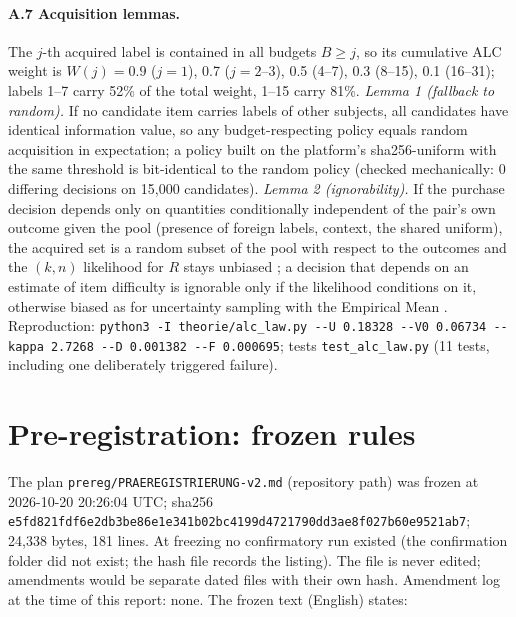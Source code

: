 \documentclass{article}
\newcommand{\dd}{-{}-}%
\newcommand{\prereghashtex}{e5fd821fdf6e2db3be86e1e341b02bc4\allowbreak 199d4721790dd3ae8f027b60e9521ab7}
\newcommand{\preregtime}{2026-10-20 20:26:04 UTC}
\begin{document}
\paragraph{A.7 Acquisition lemmas.} The $j$-th acquired label is contained in all budgets $B \ge j$, so its cumulative
ALC weight is $W(j) = 0.9$ ($j = 1$), 0.7 ($j = 2$--3), 0.5 (4--7), 0.3 (8--15), 0.1 (16--31); labels 1--7 carry 52\% of
the total weight, 1--15 carry 81\%. \emph{Lemma 1 (fallback to random).} If no candidate item carries labels of other
subjects, all candidates have identical information value, so any budget-respecting policy equals random acquisition
in expectation; a policy built on the platform's sha256-uniform with the same threshold is bit-identical to the random
policy (checked mechanically: 0 differing decisions on 15,000 candidates). \emph{Lemma 2 (ignorability).} If the purchase
decision depends only on quantities conditionally independent of the pair's own outcome given the pool (presence of
foreign labels, context, the shared uniform), the acquired set is a random subset of the pool with respect to the
outcomes and the $(k, n)$ likelihood for $R$ stays unbiased \citep{rubin1976}; a decision that depends on an estimate of
item difficulty is ignorable only if the likelihood conditions on it, otherwise biased as for uncertainty sampling with
the Empirical Mean \citep{kossen2021activetesting, sawade2010activerisk}. Reproduction:
\texttt{python3 -I theorie/alc\_law.py \dd U 0.18328 \dd V0 0.06734 \dd kappa 2.7268 \dd D 0.001382 \dd F 0.000695};
tests \texttt{test\_alc\_law.py} (11 tests, including one deliberately triggered failure).

\section{Pre-registration: frozen rules}
\label{app:prereg}

The plan \texttt{prereg/PRAEREGISTRIERUNG-v2.md} (repository path) was frozen at \preregtime{}; sha256
\texttt{\prereghashtex}; 24,338 bytes, 181 lines. At freezing no confirmatory run existed (the confirmation folder did not
exist; the hash file records the listing). The file is never edited; amendments would be separate dated files with
their own hash. Amendment log at the time of this report: none. The frozen text (English) states:
\end{document}
